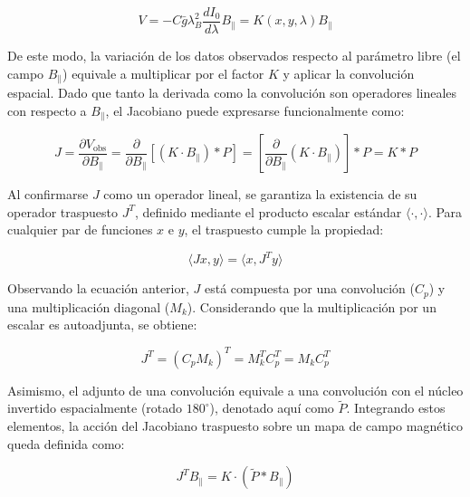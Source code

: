\begin{equation}
    V = - C \bar{g} \lambda_B^2 \frac{dI_0}{d \lambda} B_{\parallel} = K(x, y, \lambda) B_{\parallel}
\end{equation}

De este modo, la variación de los datos observados respecto al parámetro libre (el campo $B_{\parallel}$) equivale a multiplicar por el factor $K$ y aplicar la convolución espacial. Dado que tanto la derivada como la convolución son operadores lineales con respecto a $B_{\parallel}$, el Jacobiano puede expresarse funcionalmente como:

\begin{equation}
    J = \frac{\partial V_{\mathrm{obs}}}{\partial B_{\parallel}} = \frac{\partial}{\partial B_{\parallel}} \left[(K \cdot B_{\parallel}) * P \right] = \left[\frac{\partial}{\partial B_{\parallel}} (K \cdot B_{\parallel})\right] * P = K * P \label{eq:demosLinealidad}
\end{equation}

Al confirmarse $J$ como un operador lineal, se garantiza la existencia de su operador traspuesto $J^T$, definido mediante el producto escalar estándar $\langle \cdot , \cdot \rangle$. Para cualquier par de funciones $x$ e $y$, el traspuesto cumple la propiedad:

\begin{equation}
    \langle Jx , y \rangle = \langle x , J^T y \rangle \label{eq:defTraspuesta}
\end{equation}

Observando la ecuación anterior, $J$ está compuesta por una convolución ($C_p$) y una multiplicación diagonal ($M_k$). Considerando que la multiplicación por un escalar es autoadjunta, se obtiene:

\begin{equation}
    J^T = (C_p M_k)^T = M^T_k C_p^T = M_k C_p^T \label{eq:defTraspuesConjunta}
\end{equation}

Asimismo, el adjunto de una convolución equivale a una convolución con el núcleo invertido espacialmente (rotado $180^\circ$), denotado aquí como $\tilde{P}$. Integrando estos elementos, la acción del Jacobiano traspuesto sobre un mapa de campo magnético queda definida como:

\begin{equation}
    J^T B_{\parallel} = K \cdot (\tilde{P} \ast B_{\parallel}) \label{eq:jacobianaTras}
\end{equation}

